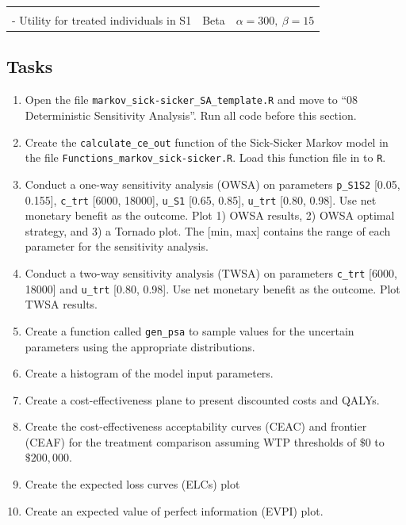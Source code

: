 \documentclass[]{article}
\begin{document}
\begin{longtable}[]{@{}lrr@{}}
\begin{minipage}[t]{0.17\columnwidth}
\strut
\end{minipage} & \begin{minipage}[t]{0.42\columnwidth}\raggedleft\strut
\strut
\end{minipage}\tabularnewline
\begin{minipage}[t]{0.32\columnwidth}\raggedright\strut
- Utility for treated individuals in S1\strut
\end{minipage} & \begin{minipage}[t]{0.17\columnwidth}\raggedleft\strut
Beta\strut
\end{minipage} & \begin{minipage}[t]{0.42\columnwidth}\raggedleft\strut
\(\alpha = 300, \ \beta = 15\)\strut
\end{minipage}\tabularnewline
\bottomrule
\end{longtable}

\subsection{Tasks}\label{tasks}

\begin{enumerate}
\def\labelenumi{\arabic{enumi}.}
\item
  Open the file \texttt{markov\_sick-sicker\_SA\_template.R} and move to
  ``08 Deterministic Sensitivity Analysis''. Run all code before this
  section.
\item
  Create the \texttt{calculate\_ce\_out} function of the Sick-Sicker
  Markov model in the file \texttt{Functions\_markov\_sick-sicker.R}.
  Load this function file in to \texttt{R}.
\item
  Conduct a one-way sensitivity analysis (OWSA) on parameters
  \texttt{p\_S1S2} {[}0.05, 0.155{]}, \texttt{c\_trt} {[}6000, 18000{]},
  \texttt{u\_S1} {[}0.65, 0.85{]}, \texttt{u\_trt} {[}0.80, 0.98{]}. Use
  net monetary benefit as the outcome. Plot 1) OWSA results, 2) OWSA
  optimal strategy, and 3) a Tornado plot. The {[}min, max{]} contains
  the range of each parameter for the sensitivity analysis.
\item
  Conduct a two-way sensitivity analysis (TWSA) on parameters
  \texttt{c\_trt} {[}6000, 18000{]} and \texttt{u\_trt} {[}0.80,
  0.98{]}. Use net monetary benefit as the outcome. Plot TWSA results.
\item
  Create a function called \texttt{gen\_psa} to sample values for the
  uncertain parameters using the appropriate distributions.
\item
  Create a histogram of the model input parameters.
\item
  Create a cost-effectiveness plane to present discounted costs and
  QALYs.
\item
  Create the cost-effectiveness acceptability curves (CEAC) and frontier
  (CEAF) for the treatment comparison assuming WTP thresholds of \(\$0\)
  to \(\$200,000\).
\item
  Create the expected loss curves (ELCs) plot
\item
  Create an expected value of perfect information (EVPI) plot.
\end{enumerate}
\end{document}
